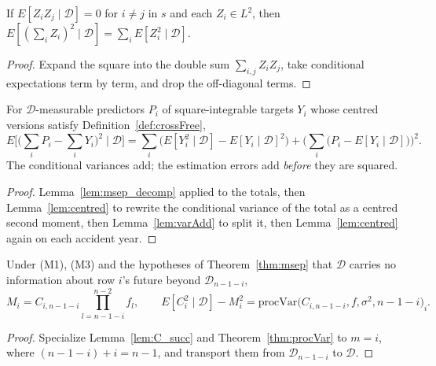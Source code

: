 \begin{lemma}\label{lem:varAdd}\leanok
{}
If $E[Z_i Z_j \mid \mathcal{D}] = 0$ for $i \ne j$ in $s$ and each $Z_i \in L^2$, then
$E[(\sum_i Z_i)^2 \mid \mathcal{D}] = \sum_i E[Z_i^2 \mid \mathcal{D}]$.
\end{lemma}
\begin{proof}\leanok
Expand the square into the double sum $\sum_{i,j} Z_i Z_j$, take conditional expectations term by
term, and drop the off-diagonal terms.
\end{proof}

\begin{theorem}\label{thm:msepSum}\leanok
{}
For $\mathcal{D}$-measurable predictors $P_i$ of square-integrable targets $Y_i$ whose centred
versions satisfy Definition~\ref{def:crossFree},
\[
  E\Big[\Big(\sum_i P_i - \sum_i Y_i\Big)^2 \;\Big|\; \mathcal{D}\Big]
  = \sum_i \big(E[Y_i^2 \mid \mathcal{D}] - E[Y_i \mid \mathcal{D}]^2\big)
  + \Big(\sum_i \big(P_i - E[Y_i \mid \mathcal{D}]\big)\Big)^2 .
\]
The conditional variances add; the estimation errors add \emph{before} they are squared.
\end{theorem}
\begin{proof}\leanok
Lemma~\ref{lem:msep_decomp} applied to the totals, then Lemma~\ref{lem:centred} to rewrite the
conditional variance of the total as a centred second moment, then Lemma~\ref{lem:varAdd} to split
it, then Lemma~\ref{lem:centred} again on each accident year.
\end{proof}

\begin{lemma}\label{lem:ultimateD}\leanok
{}
Under (M1), (M3) and the hypotheses of Theorem~\ref{thm:msep} that $\mathcal{D}$ carries no
information about row $i$'s future beyond $\mathcal{D}_{n-1-i}$,
\[
  M_i = C_{i,n-1-i} \prod_{l=n-1-i}^{n-2} f_l,
  \qquad
  E[C_i^2 \mid \mathcal{D}] - M_i^2 = \mathrm{procVar}\big(C_{i,n-1-i}, f, \sigma^2, n-1-i\big)_i .
\]
\end{lemma}
\begin{proof}\leanok
Specialize Lemma~\ref{lem:C_succ} and Theorem~\ref{thm:procVar} to $m = i$, where
$(n-1-i) + i = n-1$, and transport them from $\mathcal{D}_{n-1-i}$ to $\mathcal{D}$.
\end{proof}

